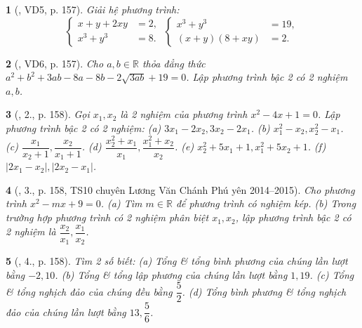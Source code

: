 \documentclass{article}
\newtheorem{baitoan}{}
\begin{document}
\begin{baitoan}[\cite{Thu_Viet_Minh_ptb2}, VD5, p. 157]
	Giải hệ phương trình:
	\begin{equation*}
		\left\{\begin{split}
			x + y + 2xy &= 2,\\
			x^3 + y^3 &= 8.
		\end{split}\right.\ \left\{\begin{split}
			x^3 + y^3 &= 19,\\
			(x + y)(8 + xy) &= 2.
		\end{split}\right.
	\end{equation*}
\end{baitoan}

\begin{baitoan}[\cite{Thu_Viet_Minh_ptb2}, VD6, p. 157]
	Cho $a,b\in\mathbb{R}$ thỏa đẳng thức $a^2 + b^2 + 3ab - 8a - 8b - 2\sqrt{3ab} + 19 = 0$. Lập phương trình bậc 2 có 2 nghiệm $a,b$.
\end{baitoan}

\begin{baitoan}[\cite{Thu_Viet_Minh_ptb2}, 2., p. 158]
	Gọi $x_1,x_2$ là 2 nghiệm của phương trình $x^2 - 4x + 1 = 0$. Lập phương trình bậc 2 có 2 nghiệm: (a) $3x_1 - 2x_2,3x_2 - 2x_1$. (b) $x_1^2 - x_2,x_2^2 - x_1$. (c) $\dfrac{x_1}{x_2 + 1},\dfrac{x_2}{x_1 + 1}$. (d) $\dfrac{x_2^2 + x_1}{x_1},\dfrac{x_1^2 + x_2}{x_2}$. (e) $x_2^2 + 5x_1 + 1,x_1^2 + 5x_2 + 1$. (f) $|2x_1 - x_2|,|2x_2 - x_1|$.
\end{baitoan}

\begin{baitoan}[\cite{Thu_Viet_Minh_ptb2}, 3., p. 158, TS10 chuyên Lương Văn Chánh Phú yên 2014--2015]
	Cho phương trình $x^2 - mx + 9 = 0$. (a) Tìm $m\in\mathbb{R}$ để phương trình có nghiệm kép. (b) Trong trường hợp phương trình có 2 nghiệm phân biệt $x_1,x_2$, lập phương trình bậc 2 có 2 nghiệm là $\dfrac{x_2}{x_1},\dfrac{x_1}{x_2}$.
\end{baitoan}

\begin{baitoan}[\cite{Thu_Viet_Minh_ptb2}, 4., p. 158]
	Tìm 2 số biết: (a) Tổng \& tổng bình phương của chúng lần lượt bằng $-2,10$. (b) Tổng \& tổng lập phương của chúng lần lượt bằng $1,19$. (c) Tổng \& tổng nghịch đảo của chúng đều bằng $\dfrac{5}{2}$. (d) Tổng bình phương \& tổng nghịch đảo của chúng lần lượt bằng $13,\dfrac{5}{6}$.
\end{baitoan}
\end{document}
